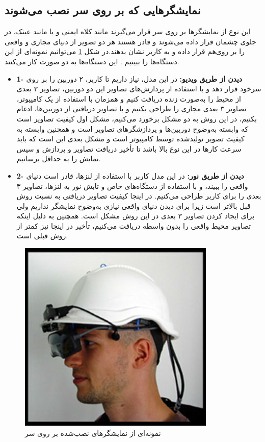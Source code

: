 \subsection{نمایشگرهایی که بر روی سر نصب می‌شوند}
 این نوع از نمایشگرها بر روی سر قرار می‌گیرند\protect{} مانند کلاه ایمنی و یا مانند عینک، در جلوی چشمان قرار داده می‌شوند و  قادر هستند هر دو تصویر از دنیای مجازی و واقعی را بر روی‌هم قرار داده و به کاربر نشان بدهند.در شکل \ref{fig:hmd} می‌توانیم نمونه‌ای از این دستگاه‌ها را ببینیم
	. این دستگاه‌ها به دو صورت کار می‌کنند.
\begin{itemize}
	\item \textbf{1- دیدن از طریق ویدیو:} در این مدل، نیاز داریم تا کاربر، ۲ دوربین را بر روی سرخود قرار دهد و با استفاده از پردازش‌های تصاویر این دو دوربین، تصاویر ۳ بعدی از محیط را  به‌صورت زنده دریافت کنیم و همزمان با استفاده از یک کامپیوتر، تصاویر ۳ بعدی مجازی را طراحی بکنیم و با تصاویر دریافتی از دوربین‌ها، ادغام بکنیم، در این روش به دو مشکل برخورد می‌کنیم، مشکل اول کیفیت تصاویر است که وابسته به‌وضوح  دوربین‌ها و پردازشگرهای تصاویر است و همچنین وابسته به کیفیت تصویر تولیدشده توسط کامپیوتر است و مشکل بعدی این است که باید سرعت کارها در این نوع بالا باشد تا تأخیر دریافت تصاویر و پردازش و سپس نمایش را به حداقل برسانیم.
	\item \textbf{
		2- دیدن از طریق نور: }در این مدل کاربر با استفاده از لنزها، قادر است دنیای واقعی را ببیند، و با استفاده از دستگاه‌های خاص و تابش نور به لنزها، تصاویر ۳ بعدی را برای کاربر طراحی می‌کنیم. در اینجا کیفیت تصاویر دریافتی به نسبت روش قبل بالاتر است زیرا برای دیدن دنیای واقعی نیازی به‌وضوح نمایشگر نداریم ولی برای ایجاد کردن تصاویر ۳ بعدی در این روش مشکل است. همچنین به دلیل اینکه تصاویر محیط واقعی را بدون واسطه دریافت می‌کنیم، تأخیر در اینجا نیز کمتر از روش قبلی است.
\end{itemize}

\begin{figure}[tb]
	\centering
	\includegraphics[width=0.6\linewidth]{image/hmd}
	\caption {نمونه‌ای از نمایشگرهای نصب‌شده بر روی سر\cite{Julie}}
	\label{fig:hmd}
\end{figure}

